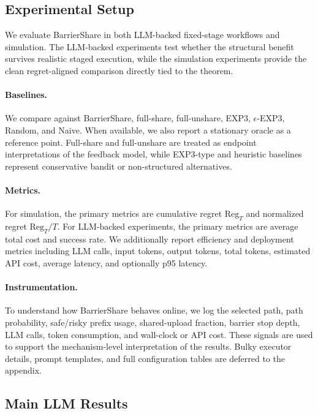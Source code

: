 \documentclass{article}
\begin{document}
\subsection{Experimental Setup}

We evaluate BarrierShare in both LLM-backed fixed-stage workflows and simulation. The LLM-backed experiments test whether the structural benefit survives realistic staged execution, while the simulation experiments provide the clean regret-aligned comparison directly tied to the theorem.

\paragraph{Baselines.}
We compare against BarrierShare, full-share, full-unshare, EXP3, $\epsilon$-EXP3, Random, and Naive. When available, we also report a stationary oracle as a reference point. Full-share and full-unshare are treated as endpoint interpretations of the feedback model, while EXP3-type and heuristic baselines represent conservative bandit or non-structured alternatives.

\paragraph{Metrics.}
For simulation, the primary metrics are cumulative regret $\mathrm{Reg}_T$ and normalized regret $\mathrm{Reg}_T/T$. For LLM-backed experiments, the primary metrics are average total cost and success rate. We additionally report efficiency and deployment metrics including LLM calls, input tokens, output tokens, total tokens, estimated API cost, average latency, and optionally p95 latency.

\paragraph{Instrumentation.}
To understand how BarrierShare behaves online, we log the selected path, path probability, safe/risky prefix usage, shared-upload fraction, barrier stop depth, LLM calls, token consumption, and wall-clock or API cost. These signals are used to support the mechanism-level interpretation of the results. Bulky executor details, prompt templates, and full configuration tables are deferred to the appendix.

\subsection{Main LLM Results}
\end{document}
